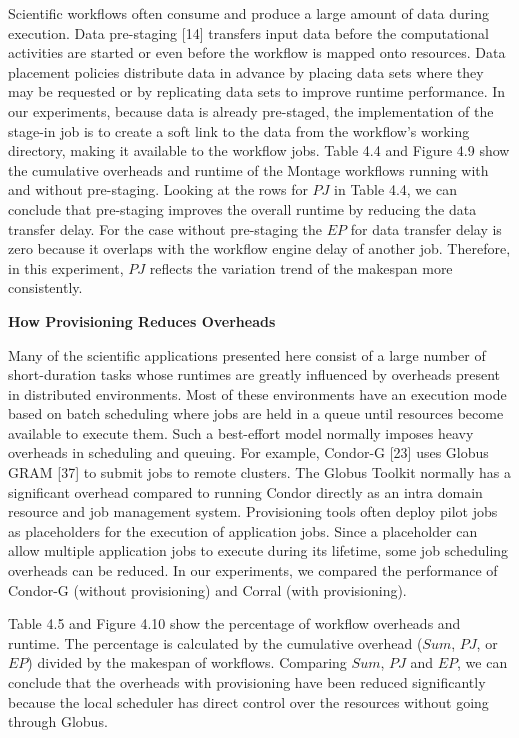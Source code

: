 \documentclass[final,5p,times,twocolumn]{elsarticle}
\begin{document}
Scientific workflows often consume and produce a large amount of data during execution. Data pre-staging [14] transfers input data before the computational activities are started or even before the workflow is mapped onto resources. Data placement policies distribute data in advance by placing data sets where they may be requested or by replicating data sets to improve runtime performance. In our experiments, because data is already pre-staged, the implementation of the stage-in job is to create a soft link to the data from the workflow’s working directory, making it available to the workflow jobs. Table 4.4 and Figure 4.9 show the cumulative overheads and runtime of the Montage workflows running with and without pre-staging. Looking at the rows for $PJ$ in Table 4.4, we can conclude that pre-staging improves the overall runtime by reducing the data transfer delay. For the case without pre-staging the $EP$ for data transfer delay is zero because it overlaps with the workflow engine delay of another job. Therefore, in this experiment, $PJ$ reflects the variation trend of the makespan more consistently. 

\textbf{How Provisioning Reduces Overheads}

Many of the scientific applications presented here consist of a large number of short-duration tasks whose runtimes are greatly influenced by overheads present in distributed environments. Most of these environments have an execution mode based on batch scheduling where jobs are held in a queue until resources become available to execute them. Such a best-effort model normally imposes heavy overheads in scheduling and queuing. For example, Condor-G [23] uses Globus GRAM [37] to submit jobs to remote clusters. The Globus Toolkit normally has a significant overhead compared to running Condor directly as an intra domain resource and job management system. Provisioning tools often deploy pilot jobs as placeholders for the execution of application jobs. Since a placeholder can allow multiple application jobs to execute during its lifetime, some job scheduling overheads can be reduced. In our experiments, we compared the performance of Condor-G (without provisioning) and Corral (with provisioning). 

Table 4.5 and Figure 4.10 show the percentage of workflow overheads and runtime. The percentage is calculated by the cumulative overhead ($Sum$, $PJ$, or $EP$) divided by the makespan of workflows. Comparing $Sum$, $PJ$ and $EP$, we can conclude that the overheads with provisioning have been reduced significantly because the local scheduler has direct control over the resources without going through Globus. 
\end{document}

